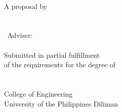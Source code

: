 \begin{titlepage}
\center
\vspace*{2.54cm}

\Title\\[2cm]

A \MakeLowercase{\Type} proposal by\\[2cm]

\Student\\
\StudentNumber\\[2cm]

\Type\ Adviser:\\
\Adviser\\[2cm]

Submitted in partial fulfillment\\of the requirements for the degree of\\
\Degree\\[2cm]

\Department\\
College of Engineering\\
University of the Philippines Diliman\\[2cm]

\SubmissionDate

\end{titlepage}
